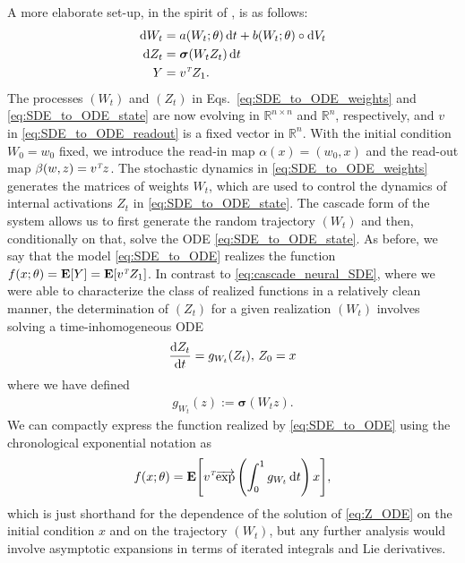 \documentclass[letterpaper, 10pt, conference]{ieeeconf}
\def\Reals{{\mathbb R}}
\def\Ex{{\mathbf E}} %
\def\trn{{\hbox{\it\tiny T}}} %
\def\deq{:=}
\begin{document}
\noindent A more elaborate set-up, in the spirit of \cite{ODEtoODE}, is as follows:
\begin{subequations}\label{eq:SDE_to_ODE}
\begin{align}
	\dif W_t &= a(W_t;\theta) \dif t + b(W_t;\theta) \circ \dif V_t \label{eq:SDE_to_ODE_weights}\\
	\dif Z_t &= \boldsymbol{\sigma}(W_t Z_t)\dif t \label{eq:SDE_to_ODE_state}\\
	Y &= v^\trn Z_1. \label{eq:SDE_to_ODE_readout}
\end{align}
\end{subequations}
The processes $(W_t)$ and $(Z_t)$ in Eqs.~\eqref{eq:SDE_to_ODE_weights} and \eqref{eq:SDE_to_ODE_state} are now evolving in $\Reals^{n \times n}$ and $\Reals^n$, respectively, and $v$ in \eqref{eq:SDE_to_ODE_readout} is a fixed vector in $\Reals^n$. With the initial condition $W_0 = w_0$ fixed, we introduce the read-in map $\alpha(x) = (w_0,x)$ and the read-out map $\beta(w,z) = v^\trn z$. The stochastic dynamics in \eqref{eq:SDE_to_ODE_weights} generates the matrices of weights $W_t$, which are used to control the dynamics of internal activations $Z_t$ in \eqref{eq:SDE_to_ODE_state}. The cascade form of the system allows us to first generate the random trajectory $(W_t)$ and then, conditionally on that, solve the ODE \eqref{eq:SDE_to_ODE_state}. As before, we say that the model \eqref{eq:SDE_to_ODE} realizes the function $f(x;\theta) = \Ex[Y] = \Ex[v^\trn Z_1]$. In contrast to \eqref{eq:cascade_neural_SDE}, where we were able to characterize the class of realized functions in a relatively clean manner, the determination of $(Z_t)$ for a given realization $(W_t)$ involves solving a time-inhomogeneous ODE
\begin{align}\label{eq:Z_ODE}
	\frac{\dif Z_t}{\dif t} = g_{W_t}(Z_t), \, Z_0 = x
\end{align}
where we have defined
\begin{align}\label{eq:gW}
	g_{W_t}(z) \deq \boldsymbol{\sigma}(W_tz).
\end{align}
We can compactly express the function realized by \eqref{eq:SDE_to_ODE} using the chronological exponential notation \cite{agrachev_sachkov_2004} as
\begin{align*}
	f(x;\theta) = \Ex\Bigg[v^\trn \overrightarrow{\exp}\left(\int^1_0 g_{W_t} \dif t\right)x \Bigg],
\end{align*}
which is just shorthand for the dependence of the solution of \eqref{eq:Z_ODE} on the initial condition $x$ and on the trajectory $(W_t)$, but any further analysis would involve asymptotic expansions in terms of iterated integrals and Lie derivatives.
\end{document}
